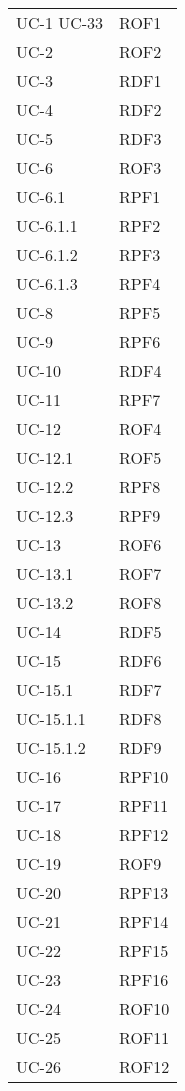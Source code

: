 \begin{longtable}{| p{5cm} | p{5cm} |}
		UC-1 \newline UC-33 & ROF1  \\
		\rowcolor{LightGray}
		UC-2 & ROF2 \\
		UC-3 & RDF1 \\
		\rowcolor{LightGray}
		UC-4 & RDF2 \\
		UC-5 & RDF3 \\
		\rowcolor{LightGray}
		UC-6 & ROF3 \\
		UC-6.1 & RPF1 \\
		\rowcolor{LightGray}
		UC-6.1.1 & RPF2 \\
		UC-6.1.2 & RPF3 \\
		\rowcolor{LightGray}
		UC-6.1.3 & RPF4 \\
		UC-8 & RPF5 \\
		\rowcolor{LightGray}
		UC-9 & RPF6 \\
		UC-10 & RDF4 \\
		\rowcolor{LightGray}
		UC-11 & RPF7 \\
		UC-12 & ROF4 \\
		\rowcolor{LightGray}
		UC-12.1 & ROF5 \\
		UC-12.2 & RPF8 \\
		\rowcolor{LightGray}
		UC-12.3 & RPF9 \\
		UC-13 & ROF6 \\
		\rowcolor{LightGray}
		UC-13.1 & ROF7 \\
		UC-13.2 & ROF8 \\
		\rowcolor{LightGray}
		UC-14 & RDF5\\
		UC-15 & RDF6 \\
		\rowcolor{LightGray}
		UC-15.1 & RDF7\\
		UC-15.1.1 & RDF8\\
		\rowcolor{LightGray}
		UC-15.1.2 & RDF9\\
		UC-16 & RPF10\\
		\rowcolor{LightGray}
		UC-17 & RPF11\\
		UC-18 & RPF12 \\
		\rowcolor{LightGray}
		UC-19 & ROF9 \\
		UC-20 & RPF13 \\
		\rowcolor{LightGray}
		UC-21 & RPF14 \\
		UC-22 & RPF15 \\ 
		\rowcolor{LightGray}
		UC-23 & RPF16\\
		UC-24 & ROF10 \\
		\rowcolor{LightGray}
		UC-25 & ROF11 \\
		UC-26 & ROF12 \\

\end{longtable}
